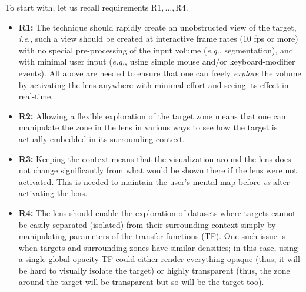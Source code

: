 To start with, let us recall requirements R1$,\ldots,$R4.
\begin{itemize}
\item{\textbf{R1:}} The technique should rapidly create an unobstructed view of the target, \emph{i.e.}, such a view should be created at interactive frame rates (10 fps or more) with no special pre-processing of the input volume (\emph{e.g.}, segmentation), and with minimal user input (\emph{e.g.}, using simple mouse and/or keyboard-modifier events). All above are needed to ensure that one can freely \emph{explore} the volume by activating the lens anywhere with minimal effort and seeing its effect in real-time.

\item{\textbf{R2:}} Allowing a flexible exploration of the target zone means that one can manipulate the zone in the lens in various ways to see how the target is actually embedded in its surrounding context.

\item{\textbf{R3:}} Keeping the context means that the visualization around the lens does not change significantly from what would be shown there if the lens were not activated. This is needed to maintain the user's mental map before \emph{vs} after activating the lens.

\item{\textbf{R4:}} The lens should enable the exploration of datasets where targets cannot be easily separated (isolated) from their surrounding context simply by manipulating parameters of the transfer functions (TF). One such issue is when targets and surrounding zones have similar densities; in this case, using a single global opacity TF could either render everything opaque (thus, it will be hard to visually isolate the target) or highly transparent (thus, the zone around the target will be transparent but so will be the target too).
\end{itemize}





